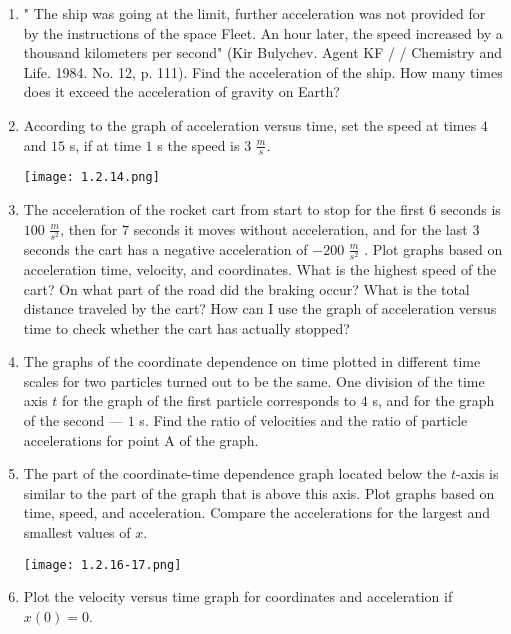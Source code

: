 \documentclass{article}
\begin{document}
\begin{enumerate}[label=1.2.\arabic*]
\item " The ship was going at the limit, further acceleration was not provided for by the instructions of the space Fleet. An hour later, the speed increased by a thousand kilometers per second" (Kir Bulychev. Agent KF / / Chemistry and Life. 1984. No. 12, p. 111). Find the acceleration of the ship. How many times does it exceed the acceleration of gravity on Earth?

\item According to the graph of acceleration versus time, set the speed at times $4$ and $15$ s, if at time $1$ s the speed is $3$ $\frac{m}{s}$.

\begin{center}
    \texttt{[image: 1.2.14.png]}
\end{center}

\item The acceleration of the rocket cart from start to stop for the first $6$ seconds is $100$ $\frac{m}{s^2}$, then for $7$ seconds it moves without acceleration, and for the last $3$ seconds the cart has a negative acceleration of $-200$ $\frac{m}{s^2}$ . Plot graphs based on acceleration time, velocity, and coordinates. What is the highest speed of the cart? On what part of the road did the braking occur? What is the total distance traveled by the cart? How can I use the graph of acceleration versus time to check whether the cart has actually stopped?

\item The graphs of the coordinate dependence on time plotted in different time scales for two particles turned out to be the same. One division of the time axis $t$ for the graph of the first particle corresponds to $4$ s, and for the graph of the second — $1$ s. Find the ratio of velocities and the ratio of particle accelerations for point A of the graph.

\item The part of the coordinate-time dependence graph located below the $t$-axis is similar to the part of the graph that is above this axis. Plot graphs based on time, speed, and acceleration. Compare the accelerations for the largest and smallest values of $x$.

\begin{center}
    \texttt{[image: 1.2.16-17.png]}
\end{center}

\item Plot the velocity versus time graph for coordinates and acceleration if $x(0) = 0$.


\end{enumerate}
\end{document}
